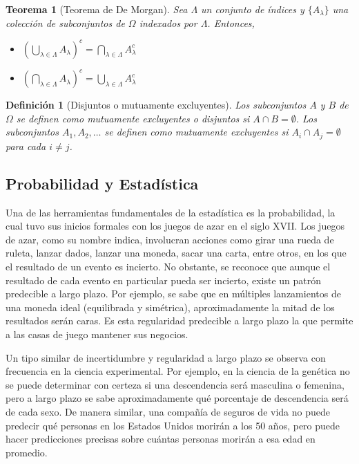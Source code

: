 \documentclass[12pt]{article}
\newtheorem{theorem}{Teorema}[section]
\newtheorem{definition}{Definición}
\begin{document}
\begin{theorem}[Teorema de De Morgan]
    Sea $\Lambda$ un conjunto de índices y $\{A_\lambda\}$ una colección de subconjuntos de $\Omega$ indexados por $\Lambda$. Entonces,
    \begin{itemize}
        \item[(i)] $\left(\bigcup\limits_{\lambda\in\Lambda} A_\lambda\right)^c = \bigcap\limits_{\lambda\in\Lambda} A_\lambda^c$
        \item[(ii)] $\left(\bigcap\limits_{\lambda\in\Lambda} A_\lambda\right)^c = \bigcup\limits_{\lambda\in\Lambda} A_\lambda^c$
    \end{itemize}
\end{theorem}

\begin{definition}[Disjuntos o mutuamente excluyentes]
    Los subconjuntos $A$ y $B$ de $\Omega$ se definen como mutuamente excluyentes o disjuntos si $A\cap B=\emptyset$. Los subconjuntos $A_1, A_2, \ldots$ se definen como mutuamente excluyentes si $A_i\cap A_j=\emptyset$ para cada $i\neq j$.
\end{definition}









\subsection{Probabilidad y Estadística}
Una de las herramientas fundamentales de la estadística es la probabilidad, la cual tuvo sus inicios formales con los juegos de azar en el siglo XVII. Los juegos de azar, como su nombre indica, involucran acciones como girar una rueda de ruleta, lanzar dados, lanzar una moneda, sacar una carta, entre otros, en los que el resultado de un evento es incierto. No obstante, se reconoce que aunque el resultado de cada evento en particular pueda ser incierto, existe un patrón predecible a largo plazo. Por ejemplo, se sabe que en múltiples lanzamientos de una moneda ideal (equilibrada y simétrica), aproximadamente la mitad de los resultados serán caras. Es esta regularidad predecible a largo plazo la que permite a las casas de juego mantener sus negocios.

Un tipo similar de incertidumbre y regularidad a largo plazo se observa con frecuencia en la ciencia experimental. Por ejemplo, en la ciencia de la genética no se puede determinar con certeza si una descendencia será masculina o femenina, pero a largo plazo se sabe aproximadamente qué porcentaje de descendencia será de cada sexo. De manera similar, una compañía de seguros de vida no puede predecir qué personas en los Estados Unidos morirán a los 50 años, pero puede hacer predicciones precisas sobre cuántas personas morirán a esa edad en promedio.\\
\end{document}
